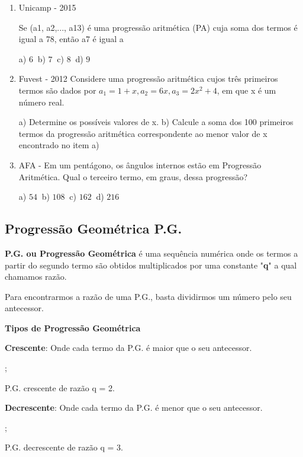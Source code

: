 \begin{multicols*}{2}
\begin{enumerate}
		\item Unicamp - 2015

		      Se (a1, a2,..., a13) é uma progressão aritmética (PA) cuja soma dos termos é igual a 78, então a7 é igual a

		      a) $6 \ $ b) $7 \ $ c) $8 \ $ d) $9 $

		\item Fuvest - 2012 Considere uma progressão aritmética cujos três primeiros termos são dados por $ a_1 = 1 + x, a_2 = 6x, a_3 = 2x^2 + 4$, em que x é um número real.

		      a) Determine os possíveis valores de x.
		      b) Calcule a soma dos 100 primeiros termos da progressão aritmética correspondente ao menor valor de x encontrado no item a)

		\item AFA - Em um pentágono, os ângulos internos estão em Progressão Aritmética. Qual o terceiro termo, em graus, dessa progressão?

		      a) $54 \ $ b) $108 \ $ c) $162 \ $ d) $216 $

	\end{enumerate}

	\subsection{Progressão Geométrica P.G.}

	\textbf{P.G. ou Progressão Geométrica} é uma sequência numérica onde os termos a partir do segundo termo são obtidos multiplicados por uma constante "\textbf{q}" a qual chamamos razão.

	Para encontrarmos a razão de uma P.G., basta dividirmos um número pelo seu antecessor.

	\textbf{Tipos de Progressão Geométrica}

	\textbf{Crescente}: Onde cada termo da P.G. é maior que o seu antecessor.

	;

	 P.G. crescente de razão q = 2.

	\textbf{Decrescente}: Onde cada termo da P.G. é menor que o seu antecessor.

	;

	 P.G. decrescente de razão q = 3.


\end{multicols*}
